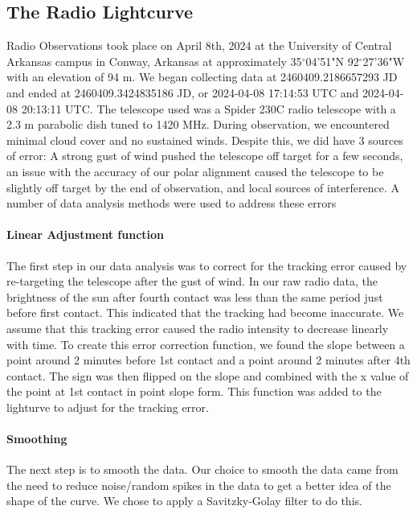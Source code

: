 \subsection{\label{sec:radio}The Radio Lightcurve}
Radio Observations took place on April 8th, 2024 at the University of Central Arkansas campus in Conway, Arkansas at approximately 35$^\circ$04'51"N 92$^\circ$27'36"W with an elevation of 94 m.
We began collecting data at 2460409.2186657293 JD and ended at 2460409.3424835186 JD, or 2024-04-08 17:14:53 UTC and 2024-04-08 20:13:11 UTC.
The telescope used was a Spider 230C radio telescope with a 2.3 m parabolic dish tuned to 1420 MHz.
During observation, we encountered minimal cloud cover and no sustained winds.
Despite this, we did have 3 sources of error: A strong gust of wind pushed the telescope off target for a few seconds, an issue with the accuracy of our polar alignment caused the telescope to be slightly off target by the end of observation, and local sources of interference.
A number of data analysis methods were used to address these errors
\paragraph{Linear Adjustment function}
The first step in our data analysis was to correct for the tracking error caused by re-targeting the telescope after the gust of wind.
In our raw radio data, the brightness of the sun after fourth contact was less than the same period just before first contact.
This indicated that the tracking had become inaccurate.
We assume that this tracking error caused the radio intensity to decrease linearly with time.
To create this error correction function, we found the slope between a point around 2 minutes before 1st contact and a point around 2 minutes after 4th contact. 
The sign was then flipped on the slope and combined with the x value of the point at 1st contact in point slope form.
This function was added to the lighturve to adjust for the tracking error.
\paragraph{Smoothing}
The next step is to smooth the data.
Our choice to smooth the data came from the need to reduce noise/random spikes in the data to get a better idea of the shape of the curve.
We chose to apply a Savitzky-Golay filter \cite{savitzky_golay_1964} to do this.


